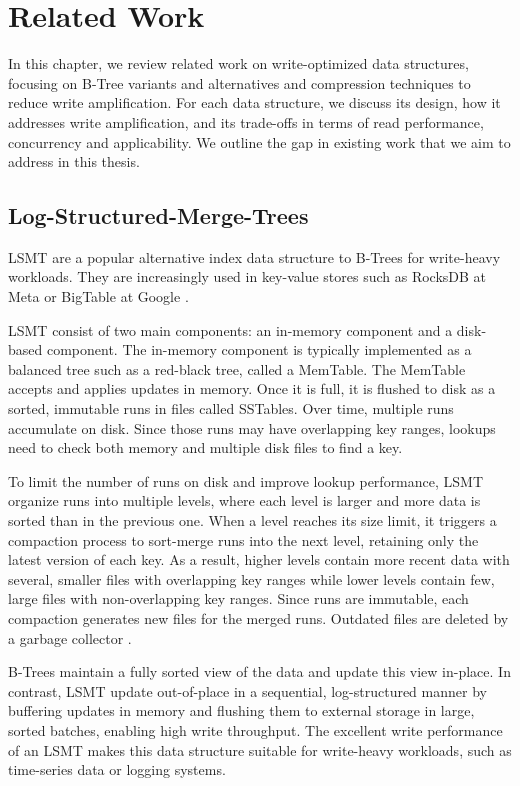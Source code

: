\chapter{Related Work}
\label{chap:related-work}
In this chapter, we review related work on write-optimized data structures, focusing on B-Tree variants and alternatives and compression techniques to reduce write amplification.
For each data structure, we discuss its design, how it addresses write amplification, and its trade-offs in terms of read performance, concurrency and applicability.
We outline the gap in existing work that we aim to address in this thesis.

\section{Log-Structured-Merge-Trees}
\ac{LSMT} \cite{oneil1996log} are a popular alternative index data structure to B-Trees for write-heavy workloads.
They are increasingly used in key-value stores such as RocksDB at Meta \cite{rocksdb} or BigTable at Google \cite{chang2008bigtable}.

\ac{LSMT} consist of two main components: an in-memory component and a disk-based component.
The in-memory component is typically implemented as a balanced tree such as a red-black tree, called a MemTable.
The MemTable accepts and applies updates in memory.
Once it is full, it is flushed to disk as a sorted, immutable runs in files called SSTables.
Over time, multiple runs accumulate on disk.
Since those runs may have overlapping key ranges, lookups need to check both memory and multiple disk files to find a key.

To limit the number of runs on disk and improve lookup performance, \ac{LSMT} organize runs into multiple levels, where each level is larger and more data is sorted than in the previous one.
When a level reaches its size limit, it triggers a compaction process to sort-merge runs into the next level, retaining only the latest version of each key.
As a result, higher levels contain more recent data with several, smaller files with overlapping key ranges while lower levels contain few, large files with non-overlapping key ranges.
Since runs are immutable, each compaction generates new files for the merged runs.
Outdated files are deleted by a garbage collector \cite{sarkar2022lsmt}.


B-Trees maintain a fully sorted view of the data and update this view in-place.
In contrast, \ac{LSMT} update out-of-place in a sequential, log-structured manner by buffering updates in memory and flushing them to external storage in large, sorted batches, enabling high write throughput.
The excellent write performance of an \ac{LSMT} makes this data structure suitable for write-heavy workloads, such as time-series data or logging systems.

